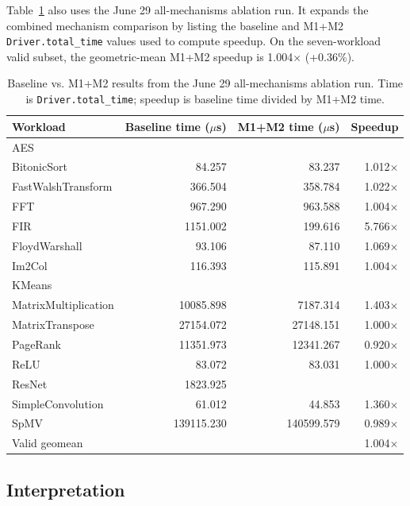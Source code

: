 \documentclass[sigconf,screen,review]{acmart}
\begin{document}
Table~\ref{tab:m1m2-final} also uses the June 29 all-mechanisms ablation run.
It expands the combined mechanism comparison by listing the baseline and M1+M2
\texttt{Driver.total\_time} values used to compute speedup.  On the
seven-workload valid subset, the
geometric-mean M1+M2 speedup is 1.004$\times$ (+0.36\%).

\begin{table}[t]
  \centering
  \caption{Baseline vs. M1+M2 results from the June 29 all-mechanisms ablation
  run.  Time is
  \texttt{Driver.total\_time}; speedup is baseline time divided by M1+M2 time.}
  \label{tab:m1m2-final}
  \scriptsize
  \begin{tabular}{lrrr}
    \toprule
    Workload & Baseline time ($\mu$s) & M1+M2 time ($\mu$s) & Speedup \\
    \midrule
    AES & & & \\
    BitonicSort & 84.257 & 83.237 & 1.012$\times$ \\
    FastWalshTransform & 366.504 & 358.784 & 1.022$\times$ \\
    FFT & 967.290 & 963.588 & 1.004$\times$ \\
    FIR & 1151.002 & 199.616 & 5.766$\times$ \\
    FloydWarshall & 93.106 & 87.110 & 1.069$\times$ \\
    Im2Col & 116.393 & 115.891 & 1.004$\times$ \\
    KMeans & & & \\
    MatrixMultiplication & 10085.898 & 7187.314 & 1.403$\times$ \\
    MatrixTranspose & 27154.072 & 27148.151 & 1.000$\times$ \\
    PageRank & 11351.973 & 12341.267 & 0.920$\times$ \\
    ReLU & 83.072 & 83.031 & 1.000$\times$ \\
    ResNet & 1823.925 & & \\
    SimpleConvolution & 61.012 & 44.853 & 1.360$\times$ \\
    SpMV & 139115.230 & 140599.579 & 0.989$\times$ \\
    \midrule
    Valid geomean & & & 1.004$\times$ \\
    \bottomrule
  \end{tabular}
\end{table}

\subsection{Interpretation}
\end{document}
